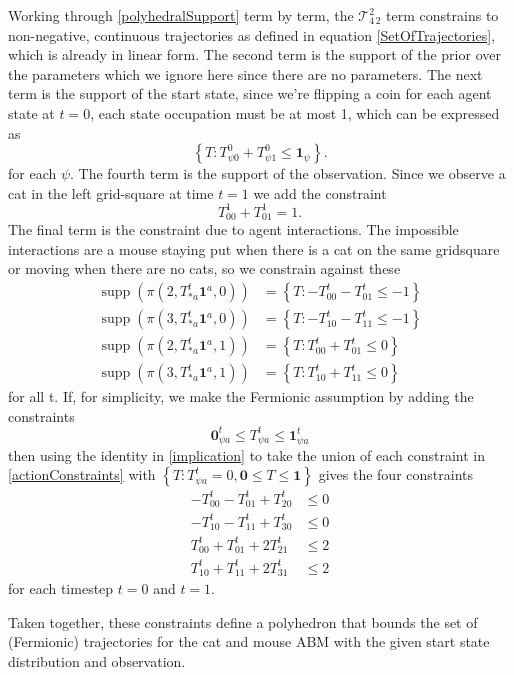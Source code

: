 \documentclass{article}
\DeclareMathOperator\supp{supp}
\begin{document}
Working through \eqref{polyhedralSupport} term by term, the $\mathcal{T}^2_{4\,2}$ term constrains to non-negative, continuous trajectories as defined in equation \eqref{SetOfTrajectories}, which is already in linear form. The second term is the support of the prior over the parameters which we ignore here since there are no parameters. The next term is the support of the start state, since we're flipping a coin for each agent state at $t=0$, each state occupation must be at most 1, which can be expressed as
\[
\left\{T:T^0_{\psi 0} + T^0_{\psi 1} \le \mathbf{1}_{\psi}\right\}.
\]
for each $\psi$. The fourth term is the support of the observation. Since we observe a cat in the left grid-square at time $t=1$ we add the constraint
\[
T^1_{0 0} + T^1_{0 1} = 1.
\]
The final term is the constraint due to agent interactions. The impossible interactions are a mouse staying put when there is a cat on the same gridsquare or moving when there are no cats, so we constrain against these
\begin{equation}
\begin{aligned}
\supp(\pi(2,T^t_{* a}\mathbf{1}^a,0)) &= \left\{ T: -T^t_{0 0} - T^t_{0 1} \le -1 \right\}\\
\supp(\pi(3,T^t_{* a}\mathbf{1}^a,0)) &= \left\{ T: -T^t_{1 0} - T^t_{1 1} \le -1 \right\}\\
\supp(\pi(2,T^t_{* a}\mathbf{1}^a,1)) &= \left\{ T: T^t_{0 0} + T^t_{0 1} \le 0 \right\}\\
\supp(\pi(3,T^t_{* a}\mathbf{1}^a,1)) &= \left\{ T: T^t_{1 0} + T^t_{1 1} \le 0 \right\}
\end{aligned}
\label{actionConstraints}
\end{equation}
for all t. If, for simplicity, we make the Fermionic assumption by adding the constraints
\[
\mathbf{0}^t_{\psi a} \le T^t_{\psi a} \le \mathbf{1}^t_{\psi a}
\]
then using the identity in \eqref{implication} to take the union of each constraint in \eqref{actionConstraints} with $\left\{T: T^t_{\psi a} = 0, \mathbf{0} \le T \le \mathbf{1}\right\}$ gives the four constraints
\[
\begin{aligned}
-T^t_{0 0} - T^t_{0 1} + T^t_{2 0} & \le 0\\
-T^t_{1 0} - T^t_{1 1} + T^t_{3 0} & \le 0\\
T^t_{0 0} + T^t_{0 1} + 2T^t_{2 1} & \le 2 \\
T^t_{1 0} + T^t_{1 1} + 2T^t_{3 1} & \le 2
\end{aligned}
\]
for each timestep $t=0$ and $t=1$.

Taken together, these constraints define a polyhedron that bounds the set of (Fermionic) trajectories for the cat and mouse ABM with the given start state distribution and observation.
\end{document}

